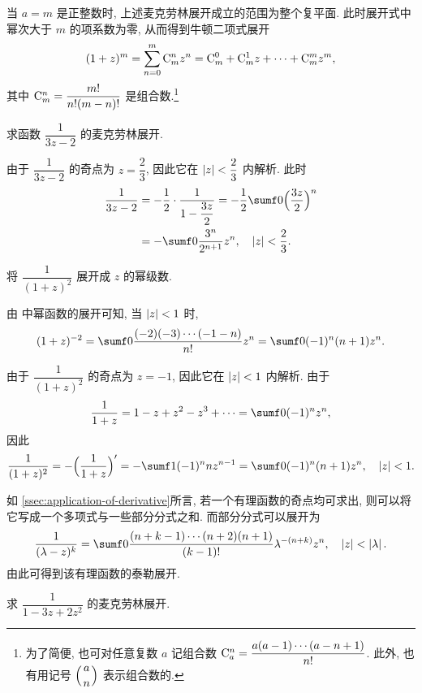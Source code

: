 当 $a=m$ 是正整数时, 上述麦克劳林展开成立的范围为整个复平面.
此时展开式中幂次大于 $m$ 的项系数为零, 从而得到牛顿二项式展开
\[
   (1+z)^m
  =\sum_{n=0}^m {\mathrm{C}}_m^n z^n
  ={\mathrm{C}}_m^0+{\mathrm{C}}_m^1 z+\cdots+{\mathrm{C}}_m^m z^m,
\]
其中 ${\mathrm{C}}_m^n=\dfrac{m!}{n!(m-n)!}$ 是组合数.\footnote{
  为了简便, 也可对任意复数 $a$ 记组合数 ${\mathrm{C}}_a^n=\dfrac{a(a-1)\cdots(a-n+1)}{n!}$.
  此外, 也有用记号 $\Bigl(\genfrac{}{}{0pt}{0}an\Bigr)$ 表示组合数的.
}

\begin{example}
  求函数 $\dfrac1{3z-2}$ 的麦克劳林展开.
\end{example}

\begin{solution}
  由于 $\dfrac1{3z-2}$ 的奇点为 $z=\dfrac23$, 因此它在 $\left|z\right|<\dfrac23$ 内解析.
  此时
  \begin{align*}
     \frac1{3z-2}&
    =-\half\cdot\frac1{1-\dfrac{3z}2}
    =-\half\sumf0 \Bigl(\frac{3z}2\Bigr)^n\\&
    =-\sumf0 \frac{3^n}{2^{n+1}}z^n,
      \quad\abs{z}<\frac23.
  \end{align*}
\end{solution}

\begin{example}
  将 $\dfrac1{(1+z)^2}$ 展开成 $z$ 的幂级数.
\end{example}

\begin{solution}[解法一]
  由 中幂函数的展开可知, 当 $\left|z\right|<1$ 时,
  \[
    (1+z)^{-2}=\sumf0 \frac{(-2)(-3)\cdots(-1-n)}{n!}z^n
    =\sumf0 (-1)^n(n+1)z^n.
  \]
\end{solution}

\begin{solution}[解法二]
  由于 $\dfrac1{(1+z)^2}$ 的奇点为 $z=-1$, 因此它在 $\left|z\right|<1$ 内解析.
  由于
  \[
     \frac1{1+z}=1-z+z^2-z^3+\cdots
    =\sumf0 (-1)^nz^n,
  \]
  因此
  \[
     \frac1{(1+z)^2}
    =-\Bigl(\frac1{1+z}\Bigr)'
    =-\sumf1 (-1)^n nz^{n-1}
    =\sumf0 (-1)^n (n+1)z^n,\quad \abs{z}<1.
  \]
\end{solution}

如 \ref{ssec:application-of-derivative}所言, 若一个有理函数的奇点均可求出, 则可以将它写成一个多项式与一些部分分式之和.
而部分分式可以展开为
\[
   \frac1{(\lambda-z)^k}
  =\sumf0 \frac{(n+k-1)\cdots(n+2)(n+1)}{(k-1)!}\lambda^{-(n+k)}z^n,\quad \abs{z}<\abs{\lambda}.
\]
由此可得到该有理函数的泰勒展开.

\begin{exercise}
  求 $\dfrac1{1-3z+2z^2}$ 的麦克劳林展开.
\end{exercise}
\smallskip

